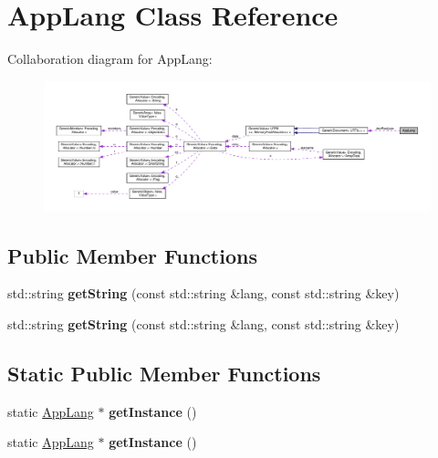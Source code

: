 \hypertarget{classAppLang}{}\section{App\+Lang Class Reference}
\label{classAppLang}


Collaboration diagram for App\+Lang\+:
\nopagebreak
\begin{figure}[H]
\begin{center}
\leavevmode
\includegraphics[width=350pt]{classAppLang__coll__graph}
\end{center}
\end{figure}
\subsection*{Public Member Functions}
\begin{DoxyCompactItemize}
\item 
\mbox{\label{classAppLang_a46c41df967d6cf46f44a07d6e61365d0}} 
std\+::string {\bfseries get\+String} (const std\+::string \&lang, const std\+::string \&key)
\item 
\mbox{\label{classAppLang_a46c41df967d6cf46f44a07d6e61365d0}} 
std\+::string {\bfseries get\+String} (const std\+::string \&lang, const std\+::string \&key)
\end{DoxyCompactItemize}
\subsection*{Static Public Member Functions}
\begin{DoxyCompactItemize}
\item 
\mbox{\label{classAppLang_afad3123d160f53e8421b5fcaddf6f9c5}} 
static \hyperlink{classAppLang}{App\+Lang} $\ast$ {\bfseries get\+Instance} ()
\item 
\mbox{\label{classAppLang_a8a2ec5bad58e047c7c6eefdafb4c8fa6}} 
static \hyperlink{classAppLang}{App\+Lang} $\ast$ {\bfseries get\+Instance} ()
\end{DoxyCompactItemize}
